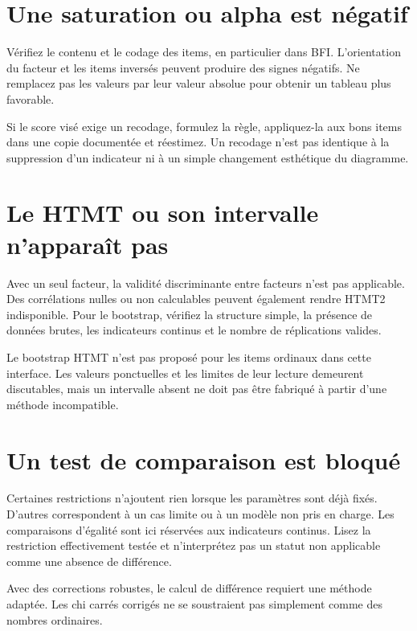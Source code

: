 \documentclass[
  french,
  11pt,
  a4paper,
  DIV=11,
  numbers=noendperiod]{scrreprt}
\begin{document}
\section{Une saturation ou alpha est
négatif}\label{une-saturation-ou-alpha-est-nuxe9gatif}

Vérifiez le contenu et le codage des items, en particulier dans BFI.
L'orientation du facteur et les items inversés peuvent produire des
signes négatifs. Ne remplacez pas les valeurs par leur valeur absolue
pour obtenir un tableau plus favorable.

Si le score visé exige un recodage, formulez la règle, appliquez-la aux
bons items dans une copie documentée et réestimez. Un recodage n'est pas
identique à la suppression d'un indicateur ni à un simple changement
esthétique du diagramme.

\section{Le HTMT ou son intervalle n'apparaît
pas}\label{le-htmt-ou-son-intervalle-napparauxeet-pas}

Avec un seul facteur, la validité discriminante entre facteurs n'est pas
applicable. Des corrélations nulles ou non calculables peuvent également
rendre HTMT2 indisponible. Pour le bootstrap, vérifiez la structure
simple, la présence de données brutes, les indicateurs continus et le
nombre de réplications valides.

Le bootstrap HTMT n'est pas proposé pour les items ordinaux dans cette
interface. Les valeurs ponctuelles et les limites de leur lecture
demeurent discutables, mais un intervalle absent ne doit pas être
fabriqué à partir d'une méthode incompatible.

\section{Un test de comparaison est
bloqué}\label{un-test-de-comparaison-est-bloquuxe9}

Certaines restrictions n'ajoutent rien lorsque les paramètres sont déjà
fixés. D'autres correspondent à un cas limite ou à un modèle non pris en
charge. Les comparaisons d'égalité sont ici réservées aux indicateurs
continus. Lisez la restriction effectivement testée et n'interprétez pas
un statut non applicable comme une absence de différence.

Avec des corrections robustes, le calcul de différence requiert une
méthode adaptée. Les chi carrés corrigés ne se soustraient pas
simplement comme des nombres ordinaires.
\end{document}
